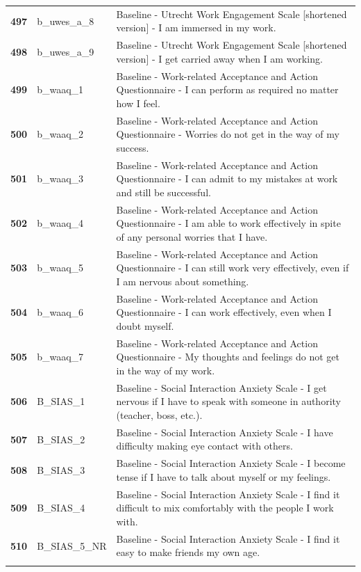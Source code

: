 \documentclass[
  letterpaper,
  DIV=11,
  numbers=noendperiod]{scrartcl}
\begin{document}
\begin{longtable}[t]{>{}cll}
\textbf{497} & b\_uwes\_a\_8 & Baseline - Utrecht Work Engagement Scale [shortened version] - I am immersed in my work.\\
\textbf{498} & b\_uwes\_a\_9 & Baseline - Utrecht Work Engagement Scale [shortened version] - I get carried away when I am working.\\
\textbf{499} & b\_waaq\_1 & Baseline - Work-related Acceptance and Action Questionnaire - I can perform as required no matter how I feel.\\
\textbf{500} & b\_waaq\_2 & Baseline - Work-related Acceptance and Action Questionnaire - Worries do not get in the way of my success.\\
\addlinespace
\textbf{501} & b\_waaq\_3 & Baseline - Work-related Acceptance and Action Questionnaire - I can admit to my mistakes at work and still be successful.\\
\textbf{502} & b\_waaq\_4 & Baseline - Work-related Acceptance and Action Questionnaire - I am able to work effectively in spite of any personal worries that I have.\\
\textbf{503} & b\_waaq\_5 & Baseline - Work-related Acceptance and Action Questionnaire - I can still work very effectively, even if I am nervous about something.\\
\textbf{504} & b\_waaq\_6 & Baseline - Work-related Acceptance and Action Questionnaire - I can work effectively, even when I doubt myself.\\
\textbf{505} & b\_waaq\_7 & Baseline - Work-related Acceptance and Action Questionnaire - My thoughts and feelings do not get in the way of my work.\\
\addlinespace
\textbf{506} & B\_SIAS\_1 & Baseline - Social Interaction Anxiety Scale - I get nervous if I have to speak with someone in authority (teacher, boss, etc.).\\
\textbf{507} & B\_SIAS\_2 & Baseline - Social Interaction Anxiety Scale - I have difficulty making eye contact with others.\\
\textbf{508} & B\_SIAS\_3 & Baseline - Social Interaction Anxiety Scale - I become tense if I have to talk about myself or my feelings.\\
\textbf{509} & B\_SIAS\_4 & Baseline - Social Interaction Anxiety Scale - I find it difficult to mix comfortably with the people I work with.\\
\textbf{510} & B\_SIAS\_5\_NR & Baseline - Social Interaction Anxiety Scale - I find it easy to make friends my own age.\\
\addlinespace

\end{longtable}
\end{document}
